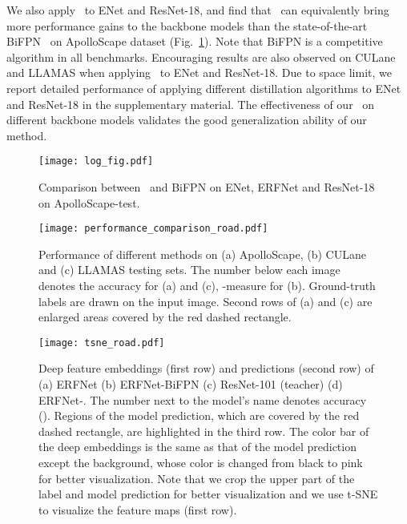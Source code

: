 \documentclass[10pt,twocolumn,letterpaper]{article}
\begin{document}
We also apply \algorithmname~to ENet and ResNet-18, and find that \algorithmname~can equivalently bring more performance gains to the backbone models than the state-of-the-art BiFPN~\cite{zhu2018bidirectional} on ApolloScape dataset (Fig.~\ref{fig:log}). Note that BiFPN is a competitive algorithm in all benchmarks. Encouraging results are also observed on CULane and LLAMAS when applying \algorithmname~to ENet and ResNet-18. Due to space limit, we report detailed performance of applying different distillation algorithms to ENet and ResNet-18 in the supplementary material. The effectiveness of our \algorithmname~on different backbone models validates the good generalization ability of our method.   


\begin{figure}[t]
  \centering
  \texttt{[image: log\_fig.pdf]}
  \vskip -0.2cm
  \caption{Comparison between \algorithmname~and BiFPN on ENet, ERFNet and ResNet-18 on ApolloScape-test.}
  \centering
  \vskip -0.2cm
  \label{fig:log}
\end{figure}

\begin{figure}[t]
  \centering
  \texttt{[image: performance\_comparison\_road.pdf]}
  \vskip -0.1cm
  \caption{Performance of different methods on (a) ApolloScape, (b) CULane and (c) LLAMAS testing sets. The number below each image denotes the accuracy for (a) and (c), -measure for (b). Ground-truth labels are drawn on the input image. Second rows of (a) and (c) are enlarged areas covered by the red dashed rectangle.}
  \centering
  \vskip -0.6cm
  \label{fig:qualitative_result}
\end{figure}

\begin{figure*}[t]
  \centering
  \texttt{[image: tsne\_road.pdf]}
  \vskip -0.2cm
  \caption{Deep feature embeddings (first row) and predictions (second row) of (a) ERFNet (b) ERFNet-BiFPN (c) ResNet-101 (teacher) (d) ERFNet-\algorithmname. The number next to the model's name denotes accuracy (). Regions of the model prediction, which are covered by the red dashed rectangle, are highlighted in the third row. The color bar of the deep embeddings is the same as that of the model prediction except the background, whose color is changed from black to pink for better visualization. Note that we crop the upper part of the label and model prediction for better visualization and we use t-SNE to visualize the feature maps (first row).}
  \centering
  \vskip -0.4cm
  \label{fig:tsne_map}
\end{figure*}
\end{document}
